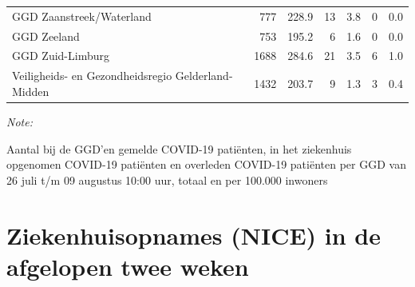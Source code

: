 \documentclass[
  english,
  man,floatsintext]{apa6}
\begin{document}
\begin{table}
\begin{threeparttable}
\begin{tabular}{lrrrrrr}
GGD Zaanstreek/Waterland & 777 & 228.9 & 13 & 3.8 & 0 & 0.0\\
GGD Zeeland & 753 & 195.2 & 6 & 1.6 & 0 & 0.0\\
GGD Zuid-Limburg & 1688 & 284.6 & 21 & 3.5 & 6 & 1.0\\
Veiligheids- en Gezondheidsregio Gelderland-Midden & 1432 & 203.7 & 9 & 1.3 & 3 & 0.4\\
\bottomrule
\end{tabular}
\begin{tablenotes}
\item \textit{Note: } 
\item Aantal bij de GGD’en gemelde COVID-19 patiënten, in het ziekenhuis opgenomen COVID-19 patiënten en overleden COVID-19 patiënten per GGD van 26 juli t/m 09 augustus 10:00 uur, totaal en per 100.000 inwoners
\end{tablenotes}
\end{threeparttable}
\endgroup{}
\end{table}

\newpage

\hypertarget{ziekenhuisopnames-nice-in-de-afgelopen-twee-weken}{%
\section{Ziekenhuisopnames (NICE) in de afgelopen twee weken}\label{ziekenhuisopnames-nice-in-de-afgelopen-twee-weken}}
\end{document}
